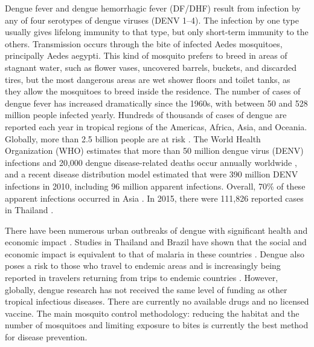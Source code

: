 \documentclass[review]{elsarticle}
\begin{document}
Dengue fever and dengue hemorrhagic fever (DF/DHF) result from infection by any of four serotypes of dengue viruses (DENV 1–4). The infection by one type usually gives lifelong immunity to that type, but only short-term immunity to the others. Transmission occurs through the bite of infected Aedes mosquitoes, principally Aedes aegypti. This kind of mosquito prefers to breed in areas of stagnant water, such as flower vases, uncovered barrels, buckets, and discarded tires, but the most dangerous areas are wet shower floors and toilet tanks, as they allow the mosquitoes to breed inside the residence. The number of cases of dengue fever has increased dramatically since the 1960s, with between 50 and 528 million people infected yearly. Hundreds of thousands of cases of dengue are reported each year in tropical regions of the Americas, Africa, Asia, and Oceania. Globally, more than 2.5 billion people are at risk \cite{whodengue2012}. The World Health Organization (WHO) estimates that more than 50 million dengue virus (DENV) infections and 20,000 dengue disease-related deaths occur annually worldwide \cite{world2007scientific,whodengue2012fact}, and a recent disease distribution model estimated that were 390 million DENV infections in 2010, including 96 million apparent infections. Overall, 70\% of these apparent infections occurred in Asia \cite{bhatt2013global}. In 2015, there were 111,826 reported cases in Thailand \cite{denguethai2015}. 
	
There have been numerous urban outbreaks of dengue with significant health and economic impact \cite{gubler2002epidemic,gubler2004cities,anuradha19981996,vaughn2000invited}. Studies in Thailand and Brazil have shown that the social and economic impact is equivalent to that of malaria in these countries \cite{clark2005economic,luz2009disability}. Dengue also poses a risk to those who travel to endemic areas and is increasingly being reported in travelers returning from trips to endemic countries \cite{farrar2007editorial}. However, globally, dengue research has not received the same level of funding as other tropical infectious diseases. There are currently no available drugs and no licensed vaccine. The main mosquito control methodology: reducing the habitat and the number of mosquitoes and limiting exposure to bites is currently the best method for disease prevention. 
	
\end{document}
